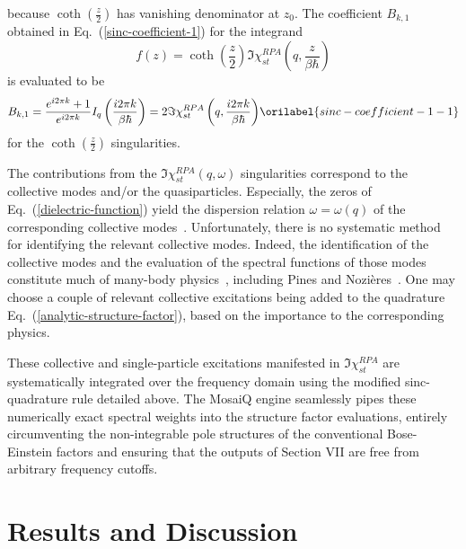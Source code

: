 \documentclass[aps,showkeys,noshowpacs,superscriptaddress,pre,preprint]{revtex4-2}
\let\label\orilabel
\begin{document}
because $\coth\left( \frac{z}{2} \right)$ has vanishing denominator at $z_0$.
The coefficient $B_{k,1}$ obtained in Eq.~(\ref{sinc-coefficient-1}) 
for the integrand 
\begin{equation*}
{f (z)} = {\coth \left( \frac{z}{2} \right)} 
{\Im \chi^{RPA}_{st}  \left( q, \frac{z}{\beta\hbar} \right) }
\end{equation*}
is evaluated to be
\begin{equation}
B_{k,1} = \frac{e^{i 2 \pi k} + 1}{e^{i 2 \pi k}} {I_q \left( \frac{i 2 \pi k}{\beta\hbar} \right) }
= 2 {\Im \chi^{RPA}_{st} \left( q, \frac{i 2 \pi k}{\beta\hbar} \right) } 
\label{sinc-coefficient-1-1}
\end{equation}
for the  $\coth\left( \frac{z}{2} \right)$ singularities.

The contributions from the 
$\Im \chi^{RPA}_{st} \left( q, \omega \right)$ singularities
correspond to the collective modes and/or the quasiparticles.
Especially, the zeros of Eq.~(\ref{dielectric-function}) yield the dispersion relation 
$\omega = \omega \left( q \right)$ of the corresponding collective modes~\cite{Pines1962}.
Unfortunately, there is no systematic method for identifying the relevant collective modes.
Indeed, the identification of the collective modes and the evaluation of the spectral functions
of those modes constitute much of many-body 
physics~\cite{Ichimaru1973,Giuliani-Vignale2005,Kremp2010,Fetter-Walecka1971,Pines1962}, including Pines and Nozi\`eres~\cite{Pines-Nozieres1989}.
One may choose a couple of relevant collective excitations being added 
to the quadrature Eq.~(\ref{analytic-structure-factor}),
based on the importance to the corresponding physics.

These collective and single-particle excitations manifested in $\Im \chi_{st}^{RPA}$ are systematically integrated over the frequency domain using the modified sinc-quadrature rule detailed above. The MosaiQ engine seamlessly pipes these numerically exact spectral weights into the structure factor evaluations, entirely circumventing the non-integrable pole structures of the conventional Bose-Einstein factors and ensuring that the outputs of Section VII are free from arbitrary frequency cutoffs.

\section{Results and Discussion}
\label{sec:results}
\end{document}
